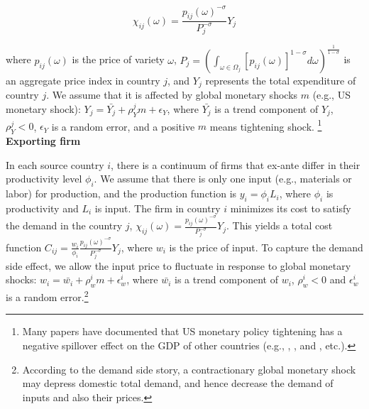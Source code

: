 \begin{equation}
\chi_{ij}(\omega)=\frac{p_{ij}(\omega)^{-\sigma}}{P_j^{-\sigma}} Y_j
\end{equation}


where $p_{ij}(\omega)$ is the price of variety $\omega$, $P_j=(\int_{\omega \in \Omega_j} [p_{ij}(\omega)]^{1-\sigma} d \omega)^{\frac{1}{1-\sigma}}$ is an aggregate price index in country $j$, and $Y_j$ represents the total expenditure of country $j$. We assume that it is affected by global monetary shocks $m$ (e.g., US monetary shock): $Y_j=\bar{Y_j}+\rho_{Y}^j m+\epsilon_Y$, where $\bar{Y_j}$ is a trend component of $Y_j$, $\rho_{Y}^j<0$, $\epsilon_Y$ is a random error, and a positive $m$ means tightening shock. \footnote{Many papers have documented that US monetary policy tightening has a negative spillover effect on the GDP of other countries (e.g., \cite{kim2001international}, \cite{georgiadis2016determinants}, and \cite{iacoviello2019foreign}, etc.).} \\
 

\textbf{Exporting firm}

In each source country $i$, there is a continuum of firms that ex-ante differ in their productivity level $\phi_i$. We assume that there is only one input (e.g., materials or labor) for production, and the production function is $ y_i= \phi_i L_i$, where $\phi_i$ is productivity and $L_i$ is input. The firm in country $i$ minimizes its cost to satisfy the demand in the country $j$, $\chi_{ij}(\omega)=\frac{p_{ij}(\omega)^{-\sigma}}{P_j^{-\sigma}} Y_j$. This yields a total cost function $ C_{ij}=\frac{w_i}{\phi_i} \frac{p_{ij}(\omega)^{-\sigma}}{P_j^{-\sigma}} Y_j$, where $w_i$ is the price of input. To capture the demand side effect, we allow the input price to fluctuate in response to global monetary shocks: $w_i=\bar{w_i}+\rho_w^i m + \epsilon_w^i$, where $\bar{w_i}$ is a trend component of $w_i$, $\rho_w^i<0$ and $\epsilon_w^i$ is a random error.\footnote{According to the demand side story, a contractionary global monetary shock may depress domestic total demand, and hence decrease the demand of inputs and also their prices.} 

